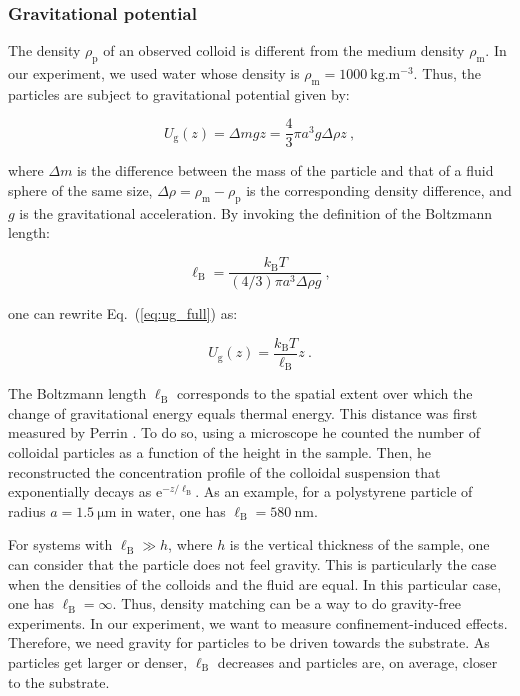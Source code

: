 \subsubsection{Gravitational potential}
\label{sec:gravit}


The density $\rho_\mathrm{p}$ of an observed colloid is different from the medium density $\rho_\mathrm{m}$. In our experiment, we used water whose density is $\rho_\mathrm{m} = 1000 ~ \mathrm{kg.m^{-3}}$. Thus, the particles are subject to gravitational potential given by:

\begin{equation}
	U_\mathrm{g} (z) = \Delta m g z = \frac{4}{3}\pi a ^3 g \Delta \rho z ~,
	\label{eq:ug_full}
\end{equation}

where $\Delta m$ is the difference between the mass of the particle and that of a fluid sphere of the same size, $\Delta \rho = \rho_\mathrm{m} - \rho_\mathrm{p}$ is the corresponding density difference, and $g$ is the gravitational acceleration. By invoking the definition of the Boltzmann length:

\begin{equation}
	\ell _\mathrm{B} = \frac{k_\mathrm{B}T}{(4/3) \pi a ^3 \Delta \rho g } ~,
	\label{lB}
\end{equation}

one can rewrite Eq.~(\ref{eq:ug_full}) as:

\begin{equation}
	U_\mathrm{g}(z) = \frac{k_\mathrm{B}T}{\ell _\mathrm{B}}z ~.
	\label{eq:ug}
\end{equation}

The Boltzmann length $\ell_\mathrm{B}$ corresponds to the spatial extent over which the change of gravitational energy equals thermal energy. This distance was first measured by Perrin \cite{perrin_les_2014}. To do so, using a microscope he counted the number of colloidal particles as a function of the height in the sample. Then, he reconstructed the concentration profile of the colloidal suspension that exponentially decays as $\mathrm{e}^{- z / \ell _\mathrm{B}}$. As an example, for a polystyrene particle of radius $a  = 1.5 ~ \mathrm{\mu m}$ in water, one has $\ell _\mathrm{B} = 580 ~ \mathrm{nm}$.

For systems with $\ell _\mathrm{B} \gg h $, where $h$ is the vertical thickness of the sample, one can consider that the particle does not feel gravity. This is particularly the case when the densities of the colloids and the fluid are equal. In this particular case, one has $\ell _\mathrm{B} = \infty$. Thus, density matching can be a way to do gravity-free experiments. In our experiment, we want to measure confinement-induced effects. Therefore, we need gravity for particles to be driven towards the substrate. As particles get larger or denser, $\ell _\mathrm{B}$ decreases and particles are, on average, closer to the substrate. 


